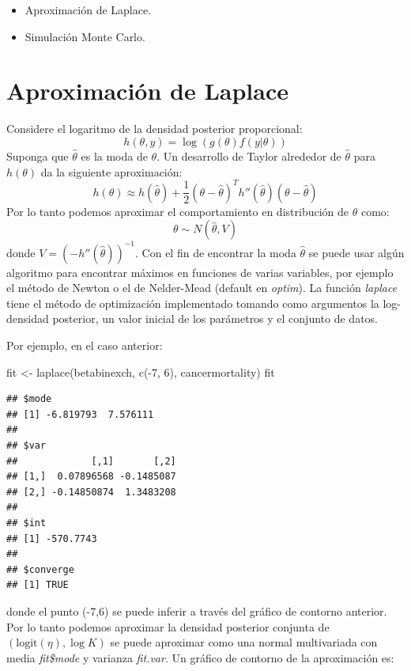 \documentclass[
  12pt,
]{book}
\newenvironment{Shaded}{\begin{snugshade}}{\end{snugshade}}
\newcommand{\DecValTok}[1]{\textcolor[rgb]{0.00,0.00,0.81}{#1}}
\newcommand{\FunctionTok}[1]{\textcolor[rgb]{0.00,0.00,0.00}{#1}}
\newcommand{\NormalTok}[1]{#1}
\newcommand{\OtherTok}[1]{\textcolor[rgb]{0.56,0.35,0.01}{#1}}
\newcommand{\SpecialCharTok}[1]{\textcolor[rgb]{0.00,0.00,0.00}{#1}}
\providecommand{\tightlist}{%
  \setlength{\itemsep}{0pt}\setlength{\parskip}{0pt}}
\theoremstyle{definition}
\theoremstyle{definition}
\theoremstyle{definition}
\theoremstyle{definition}
\theoremstyle{remark}
\begin{document}
\begin{itemize}
\tightlist
\item
  Aproximación de Laplace.
\item
  Simulación Monte Carlo.
\end{itemize}

\hypertarget{aproximaciuxf3n-de-laplace}{%
\section{Aproximación de Laplace}\label{aproximaciuxf3n-de-laplace}}

Considere el logaritmo de la densidad posterior proporcional:
\[h(\theta,y)=\log(g(\theta)f(y|\theta))\]
Suponga que \(\hat \theta\) es la moda de \(\theta\). Un desarrollo de Taylor alrededor de \(\hat \theta\) para \(h(\theta)\) da la siguiente aproximación:
\[h(\theta)\approx h(\hat \theta)+\frac 1 2(\theta-\hat \theta)^Th''(\hat \theta)(\theta-\hat \theta)\]
Por lo tanto podemos aproximar el comportamiento en distribución de \(\theta\) como:
\[\theta \sim N(\hat \theta,V)\]
donde \(V=(-h''(\hat \theta))^{-1}\). Con el fin de encontrar la moda \(\hat \theta\) se puede usar algún algoritmo para encontrar máximos en funciones de varias variables, por ejemplo el método de Newton o el de Nelder-Mead (default en \emph{optim}). La función \emph{laplace} tiene el método de optimización implementado tomando como argumentos la log-densidad posterior, un valor inicial de los parámetros y el conjunto de datos.

Por ejemplo, en el caso anterior:

\begin{Shaded}
\begin{Highlighting}[]
\NormalTok{fit }\OtherTok{\textless{}{-}} \FunctionTok{laplace}\NormalTok{(betabinexch, }\FunctionTok{c}\NormalTok{(}\SpecialCharTok{{-}}\DecValTok{7}\NormalTok{, }\DecValTok{6}\NormalTok{), cancermortality)}
\NormalTok{fit}
\end{Highlighting}
\end{Shaded}

\begin{verbatim}
## $mode
## [1] -6.819793  7.576111
## 
## $var
##             [,1]       [,2]
## [1,]  0.07896568 -0.1485087
## [2,] -0.14850874  1.3483208
## 
## $int
## [1] -570.7743
## 
## $converge
## [1] TRUE
\end{verbatim}

donde el punto (-7,6) se puede inferir a través del gráfico de contorno anterior. Por lo tanto podemos aproximar la densidad posterior conjunta de \((\text{logit}(\eta),\log K)\) se puede aproximar como una normal multivariada con media \emph{fit\$mode} y varianza \emph{fit.var}. Un gráfico de contorno de la aproximación es:
\end{document}
